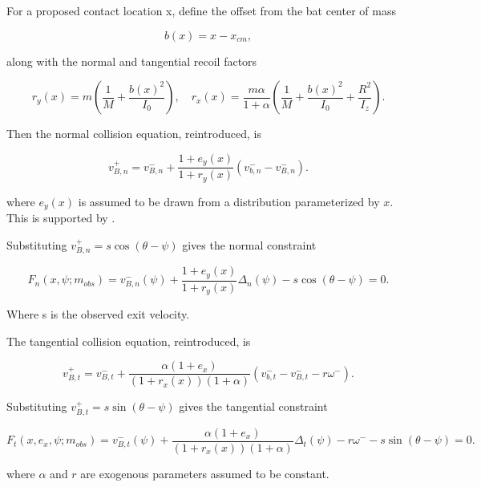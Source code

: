 \documentclass[11pt]{article}
\begin{document}
For a proposed contact location x, define the offset from the bat center of mass

\begin{equation}
b(x) = x - x_{cm},
\tag{14}
\end{equation}

along with the normal and tangential recoil factors

\begin{equation}
r_y(x)
=
m
\left(
\frac{1}{M} + \frac{b(x)^2}{I_0}
\right),
\quad
r_x(x)
=
\frac{m\alpha}{1+\alpha}
\left(
\frac{1}{M} + \frac{b(x)^2}{I_0} + \frac{R^2}{I_z}
\right).
\tag{15}
\end{equation}

Then the normal collision equation, reintroduced, is

\begin{equation}
v_{B,n}^+
=
v_{B,n}^-
+
\frac{1 + e_y(x)}{1 + r_y(x)}
\left(
v_{b,n}^- - v_{B,n}^-
\right).
\tag{17}
\end{equation}

where \(e_y(x)\) is assumed to be drawn from a distribution parameterized by \(x\). This is supported by \cite{nathan2000dynamics}.

Substituting \(v_{B,n}^+ = s \cos(\theta - \psi)\) gives the normal constraint

\begin{equation}
F_n(x, \psi; m_{obs})
=
v_{B,n}^-(\psi)
+
\frac{1 + e_y(x)}{1 + r_y(x)}
\Delta_n(\psi)
-
s \cos(\theta - \psi)
=
0.
\tag{18}
\end{equation}

Where s is the observed exit velocity.

The tangential collision equation, reintroduced, is

\begin{equation}
v_{B,t}^+
=
v_{B,t}^-
+
\frac{\alpha(1+e_x)}
{(1+r_x(x))(1+\alpha)}
\left(
v_{b,t}^- - v_{B,t}^- - r\omega^-
\right).
\tag{19}
\end{equation}

Substituting \(v_{B,t}^+ = s \sin(\theta - \psi)\) gives the tangential constraint

\begin{equation}
F_t(x, e_x, \psi; m_{obs})
=
v_{B,t}^-(\psi)
+
\frac{\alpha(1+e_x)}
{(1+r_x(x))(1+\alpha)}
\Delta_t(\psi)
-
r\omega^-
-
s\sin(\theta-\psi)
=
0.
\tag{20}
\end{equation}

where \(\alpha\) and \(r\) are exogenous parameters assumed to be constant.
\end{document}
